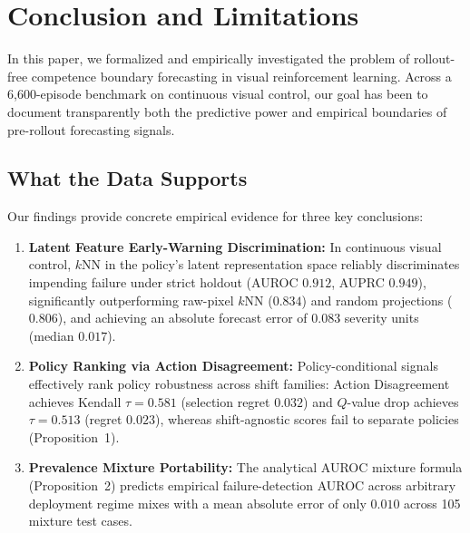 \section{Conclusion and Limitations}
\label{sec:conclusion}

In this paper, we formalized and empirically investigated the problem of rollout-free competence boundary forecasting in visual reinforcement learning.
Across a 6,600-episode benchmark on continuous visual control, our goal has been to document transparently both the predictive power and empirical boundaries of pre-rollout forecasting signals.

\subsection{What the Data Supports}
Our findings provide concrete empirical evidence for three key conclusions:
\begin{enumerate}
    \item \textbf{Latent Feature Early-Warning Discrimination:} In continuous visual control, $k$NN in the policy's latent representation space reliably discriminates impending failure under strict holdout (AUROC $0.912$, AUPRC $0.949$), significantly outperforming raw-pixel $k$NN ($0.834$) and random projections ($0.806$), and achieving an absolute forecast error of $0.083$ severity units (median $0.017$).
    \item \textbf{Policy Ranking via Action Disagreement:} Policy-conditional signals effectively rank policy robustness across shift families: Action Disagreement achieves Kendall $\tau = 0.581$ (selection regret $0.032$) and $Q$-value drop achieves $\tau = 0.513$ (regret $0.023$), whereas shift-agnostic scores fail to separate policies (Proposition~1).
    \item \textbf{Prevalence Mixture Portability:} The analytical AUROC mixture formula (Proposition~2) predicts empirical failure-detection AUROC across arbitrary deployment regime mixes with a mean absolute error of only $0.010$ across 105 mixture test cases.
\end{enumerate}

